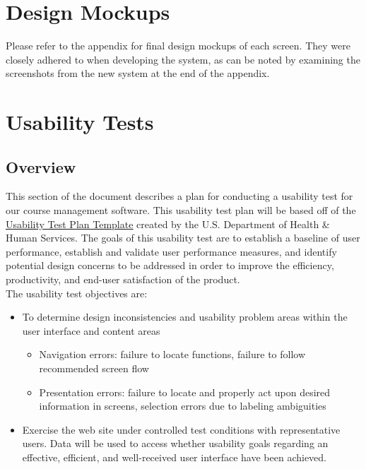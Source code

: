 \documentclass[10pt]{article}
\begin{document}
\begin{multicols}{2}
\section*{Design Mockups}
Please refer to the appendix for final design mockups of each screen. They were closely adhered to when developing the system, as can be noted by examining the screenshots from the new system at the end of the appendix.

\section*{Usability Tests}
\subsection*{Overview}
This section of the document describes a plan for conducting a usability test for our course management software. This usability test plan will be based off of the \href{http://www.usability.gov/how-to-and-tools/resources/templates/usability-test-plan-template.html}{\underline{Usability Test Plan Template}} created by the U.S. Department of Health \& Human Services. The goals of this usability test are to establish a baseline of user performance, establish and validate user performance measures, and identify potential design concerns to be addressed in order to improve the efficiency, productivity, and end-user satisfaction of the product.\\

The usability test objectives are:
\begin{itemize}
\item To determine design inconsistencies and usability problem areas within the user interface and content areas
	\begin{itemize}
	\item Navigation errors: failure to locate functions, failure to follow recommended screen flow
	\item Presentation errors: failure to locate and properly act upon desired information in screens, selection errors due to labeling ambiguities
	\end{itemize}
	
\item Exercise the web site under controlled test conditions with representative users. Data will be used to access whether usability goals regarding an effective, efficient, and well-received user interface have been achieved.


\end{itemize}
\end{multicols}
\end{document}
